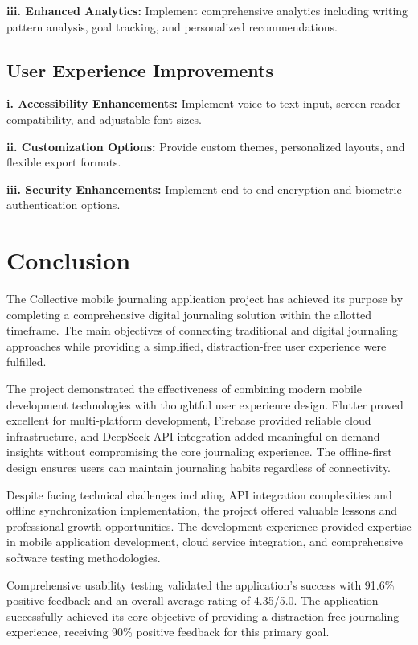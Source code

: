 \textbf{iii. Enhanced Analytics:} Implement comprehensive analytics including writing pattern analysis, goal tracking, and personalized recommendations.

\subsection{User Experience Improvements}

\textbf{i. Accessibility Enhancements:} Implement voice-to-text input, screen reader compatibility, and adjustable font sizes.

\textbf{ii. Customization Options:} Provide custom themes, personalized layouts, and flexible export formats.

\textbf{iii. Security Enhancements:} Implement end-to-end encryption and biometric authentication options.

\section{Conclusion}\label{sec:conclusion}

The Collective mobile journaling application project has achieved its purpose by completing a comprehensive digital journaling solution within the allotted timeframe. The main objectives of connecting traditional and digital journaling approaches while providing a simplified, distraction-free user experience were fulfilled.

The project demonstrated the effectiveness of combining modern mobile development technologies with thoughtful user experience design. Flutter proved excellent for multi-platform development, Firebase provided reliable cloud infrastructure, and DeepSeek API integration added meaningful on-demand insights without compromising the core journaling experience. The offline-first design ensures users can maintain journaling habits regardless of connectivity.

Despite facing technical challenges including API integration complexities and offline synchronization implementation, the project offered valuable lessons and professional growth opportunities. The development experience provided expertise in mobile application development, cloud service integration, and comprehensive software testing methodologies.

Comprehensive usability testing validated the application's success with 91.6\% positive feedback and an overall average rating of 4.35/5.0. The application successfully achieved its core objective of providing a distraction-free journaling experience, receiving 90\% positive feedback for this primary goal.

